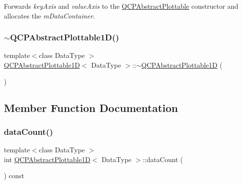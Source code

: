 Forwards {\itshape key\+Axis} and {\itshape value\+Axis} to the \hyperlink{class_q_c_p_abstract_plottable_af78a036e40db6f53a31abadc5323715a}{Q\+C\+P\+Abstract\+Plottable} constructor and allocates the {\itshape m\+Data\+Container}. \mbox{\label{class_q_c_p_abstract_plottable1_d_afa6d5d2c971fed63bff4f4a79989a3f8}} 
\subsubsection{\texorpdfstring{$\sim$\+Q\+C\+P\+Abstract\+Plottable1\+D()}{~QCPAbstractPlottable1D()}}
{\footnotesize\ttfamily template$<$class Data\+Type $>$ \\
\hyperlink{class_q_c_p_abstract_plottable1_d}{Q\+C\+P\+Abstract\+Plottable1D}$<$ Data\+Type $>$\+::$\sim$\hyperlink{class_q_c_p_abstract_plottable1_d}{Q\+C\+P\+Abstract\+Plottable1D} (\begin{DoxyParamCaption}{ }\end{DoxyParamCaption})\hspace{0.3cm}{\ttfamily [virtual]}}



\subsection{Member Function Documentation}
\mbox{\label{class_q_c_p_abstract_plottable1_d_ab5dd99e4f1621e7dbd63438e0b02984e}} 
\subsubsection{\texorpdfstring{data\+Count()}{dataCount()}}
{\footnotesize\ttfamily template$<$class Data\+Type $>$ \\
int \hyperlink{class_q_c_p_abstract_plottable1_d}{Q\+C\+P\+Abstract\+Plottable1D}$<$ Data\+Type $>$\+::data\+Count (\begin{DoxyParamCaption}{ }\end{DoxyParamCaption}) const\hspace{0.3cm}{\ttfamily [virtual]}}





